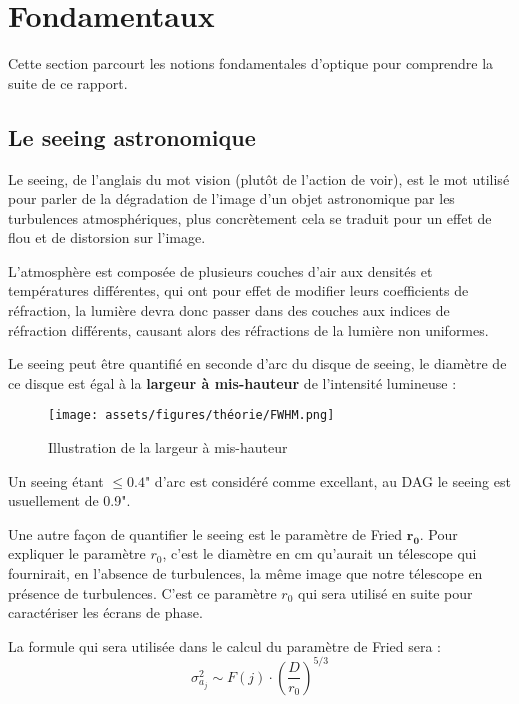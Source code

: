 \section{Fondamentaux}
Cette section parcourt les notions fondamentales d'optique pour comprendre la suite de ce rapport.

\subsection{Le seeing astronomique}
Le seeing, de l'anglais du mot vision (plutôt de l'action de voir), est le mot utilisé pour parler de la dégradation de l'image
d'un objet astronomique par les turbulences atmosphériques, plus concrètement cela se traduit pour un effet de flou et de distorsion sur l'image.

L'atmosphère est composée de plusieurs couches d'air aux densités et températures différentes, qui ont pour effet de modifier leurs coefficients de réfraction, la lumière devra donc passer
dans des couches aux indices de réfraction différents, causant alors des réfractions de la lumière non uniformes.

Le seeing peut être quantifié en seconde d'arc du disque de seeing, le diamètre de ce disque est égal à la \textbf{largeur à mis-hauteur} de l'intensité lumineuse :
\begin{figure}[H]
  \centering
  \texttt{[image: assets/figures/théorie/FWHM.png]}
  \caption[Illustration de la LMH]{Illustration de la largeur à mis-hauteur \autocite{largeur_mis_hauteur}\footnotemark}\label{fig:largeur_mis_hauteur}
\end{figure}

Un seeing étant $\leq  0.4$" d'arc est considéré comme excellant, au DAG le seeing est usuellement de 0.9".

Une autre façon de quantifier le seeing est le paramètre de Fried $\mathbf{r_0}$. Pour expliquer le paramètre $r_0$, c'est le diamètre en cm qu'aurait un télescope
qui fournirait, en l'absence de turbulences, la même image que notre télescope en présence de turbulences. C'est ce paramètre $r_0$ qui sera utilisé en suite pour caractériser les écrans de phase.

La formule qui sera utilisée dans le calcul du paramètre de Fried sera :
\begin{equation}
  \sigma_{a_j}^2 \sim F(j) \cdot (\frac{D}{r_0})^{5/3}
\end{equation}

